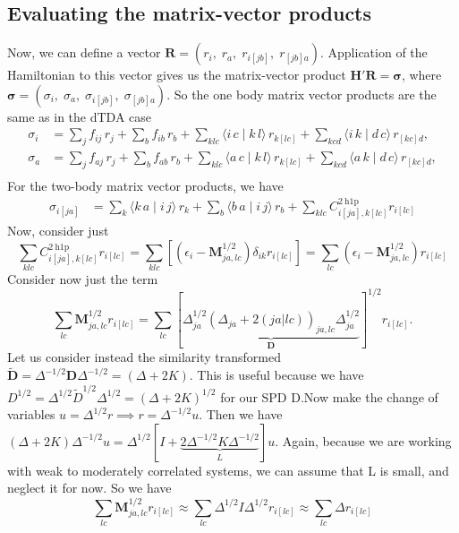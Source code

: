 \subsection{Evaluating the matrix-vector products}
Now, we can define a vector $\bm{R} = ( r_i,\; r_a,\; r_{i[jb]},\; r_{[jb]a} )$. Application of the Hamiltonian to this vector gives us the matrix-vector product $\bm{H'} \bm{R} = \bm{\sigma }$, where $\bm{\sigma} = ( \sigma_i,\; \sigma_a,\; \sigma_{i[jb]},\; \sigma_{[jb]a} )$. So the one body matrix vector products are the same as in the dTDA case
\begin{align}
\sigma_i &= 
  \sum_{j} f_{i j}\,r_j
  + \sum_{b} f_{i b}\,r_b
  + \sum_{k l c} \bigl\langle i\,c \mid k\,l \bigr\rangle\,r_{k[l c]}
  + \sum_{k c d} \bigl\langle i\,k \mid d\,c \bigr\rangle\,r_{[k c]d}, \\[6pt]
\sigma_a &=
    \sum_{j} f_{a j}\,r_j
    + \sum_{b} f_{a b}\,r_b
    + \sum_{k l c} \bigl\langle a\,c \mid k\,l \bigr\rangle\,r_{k[l c]}
    + \sum_{k c d} \bigl\langle a\,k \mid d\,c \bigr\rangle\,r_{[k c]d}, \\[6pt]
\end{align}
For the two-body matrix vector products, we have
\begin{align}
\sigma_{i[ja]} &=
    \sum_{k} \bigl\langle k\,a \mid i\,j \bigr\rangle\,r_k
    + \sum_{b} \bigl\langle b\,a \mid i\,j \bigr\rangle\,r_b
    + \sum_{klc} C_{i[j a], k[l c]}^{2 \mathrm{~h} 1 \mathrm{p}} r_{i[l c]}
\end{align}
Now, consider just
\begin{equation}
    \sum_{klc} C_{i[j a], k[l c]}^{2 \mathrm{~h} 1 \mathrm{p}} r_{i[l c]}= \sum_{klc} \left[\left(\epsilon_i-\bm{M}^{1/2}_{ja,lc}\right) \delta_{ik} r_{i[l c]} \right] = \sum_{l c} \left(\epsilon_i - \bm{M}^{1/2}_{ja,lc}\right) r_{i[l c]}
\end{equation}
Consider now just the term 
\begin{equation}
    \sum_{l c} \bm{M}^{1/2}_{ja,lc} r_{i[l c]} =  \sum_{l c} \left[\underbrace{\Delta _{ja}^{1/2} \left(\Delta_{ja} + 2(ja|lc)\right)_{ja,lc} \Delta_{ja}^{1/2}}_{\bm{D}}\right]^{1/2} r_{i[l c]}.
\end{equation}
Let us consider instead the similarity transformed $\tilde{\bm{D}} = \Delta^{-1/2} \bm{D} \Delta^{-1/2} = \left(\Delta + 2K\right)$. This is useful because we have $D^{1/2} = \Delta^{1/2}\tilde{D}^{1/2}\Delta^{1/2}=\left(\Delta+2K\right)^{1/2}$ for our SPD D.Now make the change of variables $u = \Delta^{1/2}r \implies r = \Delta^{-1/2}u$. Then we have $\left(\Delta + 2K\right) \Delta^{-1/2}u = \Delta^{1/2} \left[ {I} + \underbrace{2\Delta^{-1/2}K\Delta^{-1/2}}_{L}\right] u$. Again, because we are working with weak to moderately correlated systems, we can assume that L is small, and neglect it for now. So we have
\begin{equation}
    \sum_{l c} \bm{M}^{1/2}_{ja,lc} r_{i[l c]} \approx \sum_{l c} \Delta^{1/2} I \Delta^{1/2} r_{i[l c]} \approx \sum_{l c} \Delta r_{i[l c]}
\end{equation}


